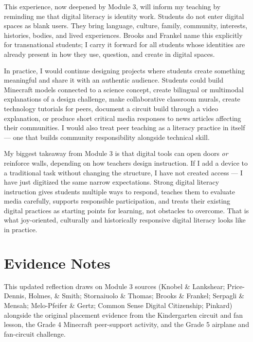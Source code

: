 \documentclass[12pt]{article}
\begin{document}
This experience, now deepened by Module 3, will inform my teaching by reminding me that digital literacy is identity work. Students do not enter digital spaces as blank users. They bring language, culture, family, community, interests, histories, bodies, and lived experiences. Brooks and Frankel name this explicitly for transnational students; I carry it forward for all students whose identities are already present in how they use, question, and create in digital spaces.

In practice, I would continue designing projects where students create something meaningful and share it with an authentic audience. Students could build Minecraft models connected to a science concept, create bilingual or multimodal explanations of a design challenge, make collaborative classroom murals, create technology tutorials for peers, document a circuit build through a video explanation, or produce short critical media responses to news articles affecting their communities. I would also treat peer teaching as a literacy practice in itself --- one that builds community responsibility alongside technical skill.

My biggest takeaway from Module 3 is that digital tools can open doors \textit{or} reinforce walls, depending on how teachers design instruction. If I add a device to a traditional task without changing the structure, I have not created access --- I have just digitized the same narrow expectations. Strong digital literacy instruction gives students multiple ways to respond, teaches them to evaluate media carefully, supports responsible participation, and treats their existing digital practices as starting points for learning, not obstacles to overcome. That is what joy-oriented, culturally and historically responsive digital literacy looks like in practice.

\section*{Evidence Notes}

This updated reflection draws on Module 3 sources (Knobel \& Lankshear; Price-Dennis, Holmes, \& Smith; Stornaiuolo \& Thomas; Brooks \& Frankel; Serpagli \& Mensah; Melo-Pfeifer \& Gertz; Common Sense Digital Citizenship; Pinkard) alongside the original placement evidence from the Kindergarten circuit and fan lesson, the Grade 4 Minecraft peer-support activity, and the Grade 5 airplane and fan-circuit challenge.
\end{document}
